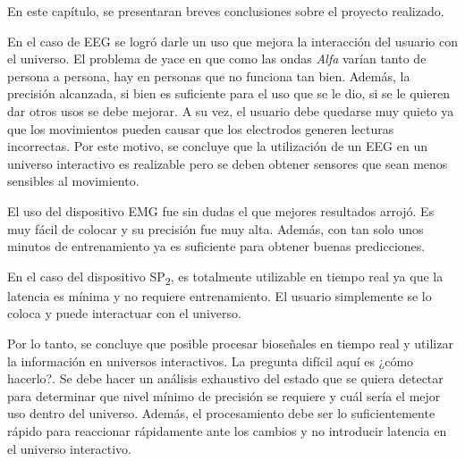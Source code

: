 En este capítulo, se presentaran breves conclusiones sobre el proyecto realizado. 

En el caso de EEG se logró darle un uso que mejora la interacción del usuario con el universo. El problema de yace en que como las ondas \emph{Alfa} varían tanto de persona a persona, hay en personas que no funciona tan bien. Además, la precisión alcanzada, si bien es suficiente para el uso que se le dio, si se le quieren dar otros usos se debe mejorar. A su vez, el usuario debe quedarse muy quieto ya que los movimientos pueden causar que los electrodos generen lecturas incorrectas. Por este motivo, se concluye que la utilización de un EEG en un universo interactivo es realizable pero se deben obtener sensores que sean menos sensibles al movimiento.

El uso del dispositivo EMG fue sin dudas el que mejores resultados arrojó. Es muy fácil de colocar y su precisión fue muy alta. Además, con tan solo unos minutos de entrenamiento ya es suficiente para obtener buenas predicciones.

En el caso del dispositivo SP\textsubscript{2}, es totalmente utilizable en tiempo real ya que la latencia es mínima y no requiere entrenamiento. El usuario simplemente se lo coloca y puede interactuar con el universo.

Por lo tanto, se concluye que posible procesar bioseñales en tiempo real y utilizar la información en universos interactivos. La pregunta difícil aquí es ¿cómo hacerlo?. Se debe hacer un análisis exhaustivo del estado que se quiera detectar para determinar que nivel mínimo de precisión se requiere y cuál sería el mejor uso dentro del universo. Además, el procesamiento debe ser lo suficientemente rápido para reaccionar rápidamente ante los cambios y no introducir latencia en el universo interactivo.